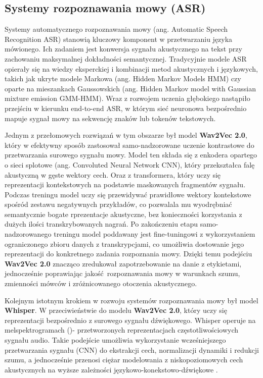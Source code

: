 \subsection{Systemy rozpoznawania mowy (ASR)}

Systemy automatycznego rozpoznawania mowy (ang. Automatic Speech Recognition ASR) stanowią kluczowy komponent w przetwarzaniu języka mówionego. Ich zadaniem jest konwersja sygnału akustycznego na tekst przy zachowaniu maksymalnej dokładności semantycznej. Tradycyjnie modele ASR opierały się na wiedzy eksperckiej i kombinacji metod akustycznych i językowych, takich jak ukryte modele Markowa (ang. Hidden Markov Models HMM) czy oparte na mieszankach Gaussowskich (ang. Hidden Markov model with Gaussian mixture emission GMM-HMM). Wraz z rozwojem uczenia głębokiego nastąpiło przejściu w kierunku end-to-end ASR, w którym sieć neuronowa bezpośrednio mapuje sygnał mowy na sekwencję znaków lub tokenów tekstowych.

Jednym z przełomowych rozwiązań w tym obszarze był model \textbf{Wav2Vec 2.0}\cite{baevski2020wav2vec}, który w efektywny sposób zastosował samo-nadzorowane uczenie kontrastowe do przetwarzania surowego sygnału mowy. Model ten składa się z enkodera opartego o sieci splotowe (ang. Convoluted Neural Network CNN), który przekształca falę akustyczną w gęste wektory cech. Oraz z transformera, który uczy się reprezentacji kontekstowych na podstawie maskowanych fragmentów sygnału. Podczas treningu model uczy się przewidywać prawidłowe wektory kontekstowe spośród zestawu negatywnych przykładów, co pozwalala mu wyodrębniać semantycznie bogate rprezentacje akustyczne, bez konieczności korzystania z dużych ilości transkrybowanych nagrań.
Po zakończeniu etapu samo-nadzorowanego treningu model poddawany jest fine-tuningowi z wykorzystaniem ograniczonego zbioru danych z transkrypcjami, co umożliwia dostowanie jego reprezentacji do konkretnego zadania rozpoznania mowy. Dzięki temu podejściu \textbf{Wav2Vec 2.0} znacząco zredukował zapotrzebowanie na danie z etykietami, jednocześnie poprawiając jakość rozpoznawania mowy w warunkach szumu, zmienności mówców i zróżnicowanego otoczenia akustycznego. 

Kolejnym istotnym krokiem w rozwoju systemów rozpoznawania mowy był model \textbf{Whisper}\cite{whisper}. W przeciwieństwie do modelu \textbf{Wav2Vec 2.0}, który uczy się reprezentacji bezpośrednio z surowego sygnału dźwiękowego. Whisper operuje na melspektrogramach ()- przetworzonych reprezentacjach częstotliwościowych sygnału audio. Takie podejście umożliwia wykorzystanie wcześniejszego przetwarzania sygnału (CNN) do ekstrakcji cech, normalizacji dynamiki i redukcji szumu, a jednocześnie przenosi ciężar modelowania z niskopoziomowych cech akustycznych na wyższe zależności językowo-konekstowo-dźwiękowe .

